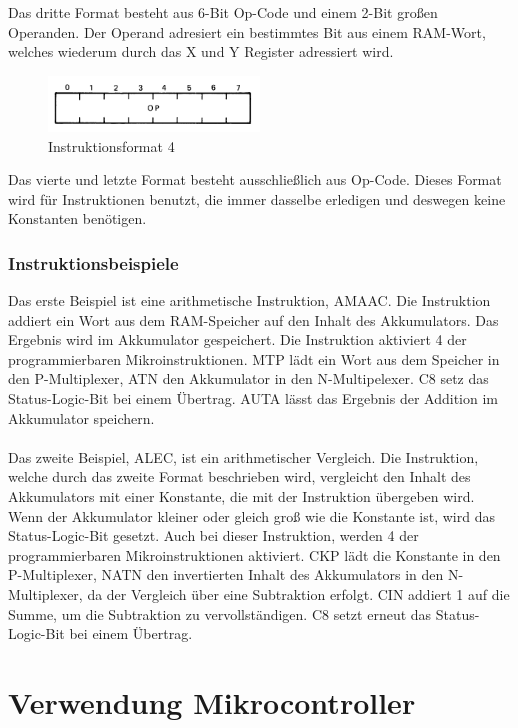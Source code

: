 Das dritte Format besteht aus 6-Bit Op-Code und einem 2-Bit gro{\ss}en Operanden. Der Operand adresiert ein bestimmtes Bit aus einem RAM-Wort, welches wiederum durch das X und Y Register adressiert wird.

\begin{figure}[!htb]
	\centering
		\includegraphics[width=0.5\textwidth]{figures/I4.PNG}
	\caption{Instruktionsformat 4}
	\label{fig:I4}
\end{figure}

Das vierte und letzte Format besteht ausschlie{\ss}lich aus Op-Code. Dieses Format wird f{\"u}r Instruktionen benutzt, die immer dasselbe erledigen und deswegen keine Konstanten ben{\"o}tigen.

\subsubsection{Instruktionsbeispiele}

Das erste Beispiel ist eine arithmetische Instruktion, AMAAC. Die Instruktion addiert ein Wort aus dem RAM-Speicher auf den Inhalt des Akkumulators. Das Ergebnis wird im Akkumulator gespeichert. Die Instruktion aktiviert 4 der programmierbaren Mikroinstruktionen. MTP l{\"a}dt ein Wort aus dem Speicher in den P-Multiplexer, ATN den Akkumulator in den N-Multipelexer. C8 setz das Status-Logic-Bit bei einem {\"U}bertrag. AUTA l{\"a}sst das Ergebnis der Addition im Akkumulator speichern. \\
\\
Das zweite Beispiel, ALEC, ist ein arithmetischer Vergleich. Die Instruktion, welche durch das zweite Format beschrieben wird, vergleicht den Inhalt des Akkumulators mit einer Konstante, die mit der Instruktion {\"u}bergeben wird. Wenn der Akkumulator kleiner oder gleich gro{\ss} wie die Konstante ist, wird das Status-Logic-Bit gesetzt. Auch bei dieser Instruktion, werden 4 der programmierbaren Mikroinstruktionen aktiviert. CKP l{\"a}dt die Konstante in den P-Multiplexer, NATN den invertierten Inhalt des Akkumulators in den N-Multiplexer, da der Vergleich {\"u}ber eine Subtraktion erfolgt. CIN addiert 1 auf die Summe, um die Subtraktion zu vervollst{\"a}ndigen. C8 setzt erneut das Status-Logic-Bit bei einem {\"U}bertrag. 

\section{Verwendung Mikrocontroller}

